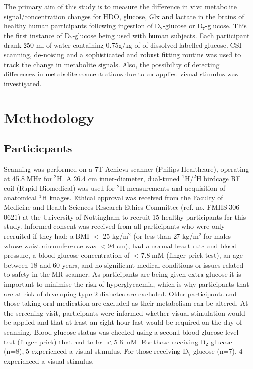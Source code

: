 The primary aim of this study is to measure the difference in vivo metabolite signal/concentration changes for \ac{HDO}, glucose, Glx and lactate in the brains of healthy human participants following ingestion of D$_2$-glucose or D$_7$-glucose. This the first instance of D$_7$-glucose being used with human subjects. Each participant drank 250 ml of water containing 0.75g/kg of of dissolved labelled glucose. \ac{CSI} scanning, de-noising and a sophisticated and robust fitting routine was used to track the change in metabolite signals. Also, the possibility of detecting differences in metabolite concentrations due to an applied visual stimulus was investigated.


\section{Methodology}

\subsection{Particicpants}

Scanning was performed on a 7T Achieva scanner (Philips Healthcare), operating at 45.8 MHz for $^2$H. A 26.4 cm inner-diameter, dual-tuned $^1$H/$^2$H birdcage \ac{RF} coil (Rapid Biomedical) was used for $^2$H measurements and acquisition of anatomical $^1$H images. Ethical approval was received from the Faculty of Medicine and Health Sciences Research Ethics Committee (ref. no. FMHS 306-0621) at the University of Nottingham to recruit 15 healthy participants for this study. Informed consent was received from all participants who were only recruited if they had: a \ac{BMI} $<$ 25 kg/m$^2$ (or less than 27 kg/m$^2$ for males whose waist circumference was $<$94 cm), had a normal heart rate and blood pressure, a blood glucose concentration of $<$7.8 mM (finger-prick test), an age between 18 and 60 years, and no significant medical conditions or issues related to safety in the MR scanner. As participants are being given extra glucose it is important to minimise the risk of hyperglycaemia, which is why participants that are at risk of developing type-2 diabetes are excluded. Older participants and those taking oral medication are excluded as their metabolism can be altered. At the screening visit, participants were informed whether visual stimulation would be applied and that at least an eight hour fast would be required on the day of scanning. Blood glucose status was checked using a second blood glucose level test (finger-prick) that had to be $<$5.6 mM. For those receiving D$_2$-glucose (n=8), 5 experienced a visual stimulus. For those receiving D$_7$-glucose (n=7), 4 experienced a visual stimulus.

